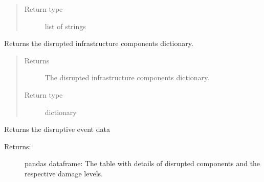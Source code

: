 \documentclass[letterpaper,10pt,english]{sphinxmanual}
\begin{document}
\begin{fulllineitems}
\begin{fulllineitems}
\begin{quote}
\begin{description}
\item[{Return type}] \leavevmode
\sphinxAtStartPar
list of strings

\end{description}\end{quote}

\end{fulllineitems}


\begin{fulllineitems}
\label{\detokenize{apidoc:dreaminsg_integrated_model.src.network_sim_models.integrated_network.IntegratedNetwork.get_disrupted_infra_dict}}
\sphinxAtStartPar
Returns the  disrupted infrastructure components dictionary.
\begin{quote}\begin{description}
\item[{Returns}] \leavevmode
\sphinxAtStartPar
The disrupted infrastructure components dictionary.

\item[{Return type}] \leavevmode
\sphinxAtStartPar
dictionary

\end{description}\end{quote}

\end{fulllineitems}


\begin{fulllineitems}
\label{\detokenize{apidoc:dreaminsg_integrated_model.src.network_sim_models.integrated_network.IntegratedNetwork.get_disruptive_events}}
\sphinxAtStartPar
Returns the disruptive event data
\begin{description}
\item[{Returns:}] \leavevmode
\sphinxAtStartPar
pandas dataframe: The table with details of disrupted components and the respective damage levels.

\end{description}

\end{fulllineitems}


\end{fulllineitems}
\end{document}

